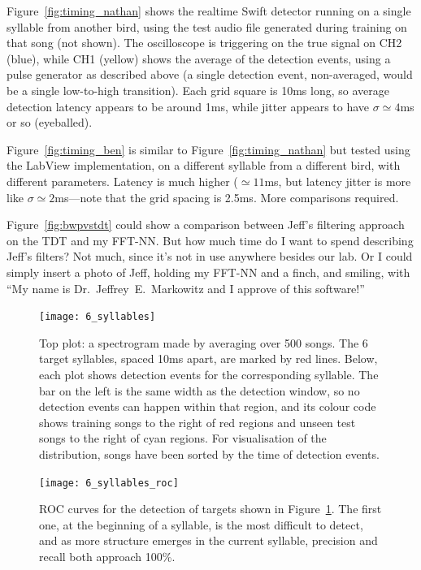 \documentclass{article}
\newcommand\fig[1]{Figure~\ref{#1}}
\let\oldmarginpar\marginpar
\renewcommand\marginpar[1]{\-\oldmarginpar[\raggedleft\footnotesize #1]
  {\raggedright\footnotesize #1}}
\begin{document}
\fig{fig:timing_nathan} shows the realtime Swift detector running on a
single syllable from another bird, using the test audio file generated
during training on that song (not shown).  The oscilloscope is
triggering on the true signal on CH2 (blue), while CH1 (yellow) shows
the average of the detection events, using a pulse generator as
described above (a single detection event, non-averaged, would be a
single low-to-high transition).  Each grid square is 10ms long, so
average detection latency appears to be around 1ms, while jitter
appears to have $\sigma\simeq 4$ms or so (eyeballed).

\fig{fig:timing_ben}\marginpar{Figure this out!} is similar to
\fig{fig:timing_nathan} but tested using the LabView implementation,
on a different syllable from a different bird, with different
parameters.  Latency is much higher ($\simeq 11$ms, but latency jitter
is more like $\sigma\simeq 2$ms---note that the grid spacing is 2.5ms.
More comparisons required.

\fig{fig:bwpvstdt} could show\marginpar{FIXME} a comparison between Jeff's filtering approach on the TDT and my FFT-NN. But how much time do I want to spend describing Jeff's filters? Not much, since it's not in use anywhere besides our lab. Or I could simply insert a photo of Jeff, holding my FFT-NN and a finch, and smiling, with ``My name is Dr.~Jeffrey~E.~Markowitz and I approve of this software!''

\begin{figure}
  \texttt{[image: 6\_syllables]}
  \caption{Top plot: a spectrogram made by averaging over 500 songs. The 6 target syllables, spaced 10ms apart, are marked by red lines. Below, each plot shows detection events for the corresponding syllable. The bar on the left is the same width as the detection window, so no detection events can happen within that region, and its colour code shows training songs to the right of red regions and unseen test songs to the right of cyan regions. For visualisation of the distribution, songs have been sorted by the time of detection events.}
  \label{fig:sixsyllables}
\end{figure}

\begin{figure}
  \texttt{[image: 6\_syllables\_roc]}
  \caption{ROC curves for the detection of targets shown in Figure~\ref{fig:sixsyllables}. The first one, at the beginning of a syllable, is the most difficult to detect, and as more structure emerges in the current syllable, precision and recall both approach 100\%.}
  \label{fig:roc}
\end{figure}
\end{document}
